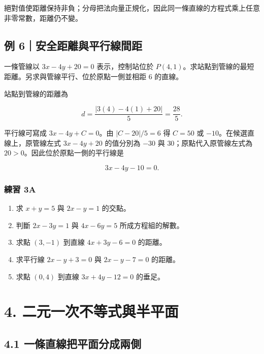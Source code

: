 \documentclass[11pt,a4paper]{article}
\providecommand{\tightlist}{%
  \setlength{\itemsep}{0pt}\setlength{\parskip}{0pt}}
\begin{document}
絕對值使距離保持非負；分母把法向量正規化，因此同一條直線的方程式乘上任意非零常數，距離仍不變。

\subsection{例 6｜安全距離與平行線間距}\label{ux4f8b-6ux5b89ux5168ux8dddux96e2ux8207ux5e73ux884cux7ddaux9593ux8ddd}

一條管線以 \(3x-4y+20=0\) 表示，控制站位於 \(P(4,1)\)。求站點到管線的最短距離。另求與管線平行、位於原點一側並相距 \(6\) 的直線。

站點到管線的距離為

\[
d=\frac{|3(4)-4(1)+20|}{5}=\frac{28}{5}.
\]

平行線可寫成 \(3x-4y+C=0\)。由 \(|C-20|/5=6\) 得 \(C=50\) 或 \(-10\)。在候選直線上，原管線左式 \(3x-4y+20\) 的值分別為 \(-30\) 與 \(30\)；原點代入原管線左式為 \(20>0\)。因此位於原點一側的平行線是

\[
\boxed{3x-4y-10=0}.
\]

\subsubsection{練習 3A}\label{ux7df4ux7fd2-3a}

\begin{enumerate}
\def\labelenumi{\arabic{enumi}.}
\tightlist
\item
  求 \(x+y=5\) 與 \(2x-y=1\) 的交點。
\item
  判斷 \(2x-3y=1\) 與 \(4x-6y=5\) 所成方程組的解數。
\item
  求點 \((3,-1)\) 到直線 \(4x+3y-6=0\) 的距離。
\item
  求平行線 \(2x-y+3=0\) 與 \(2x-y-7=0\) 的距離。
\item
  求點 \((0,4)\) 到直線 \(3x+4y-12=0\) 的垂足。
\end{enumerate}

\section{4. 二元一次不等式與半平面}\label{ux4e8cux5143ux4e00ux6b21ux4e0dux7b49ux5f0fux8207ux534aux5e73ux9762}

\subsection{4.1 一條直線把平面分成兩側}\label{ux4e00ux689dux76f4ux7ddaux628aux5e73ux9762ux5206ux6210ux5169ux5074}
\end{document}

